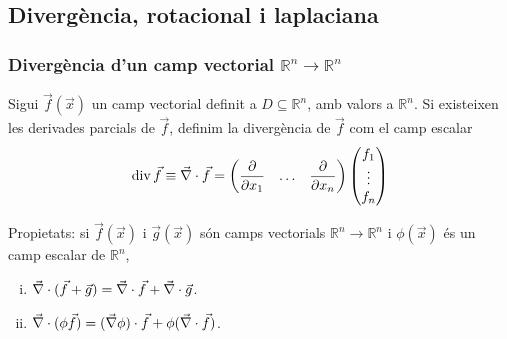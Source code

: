 \subsection{Divergència, rotacional i laplaciana}
\subsubsection*{Divergència d'un camp vectorial $\mathbb{R}^{n} \to \mathbb{R}^{n}$}
\begin{defi}[Divergència]
    Sigui $\vec{f}(\vec{x})$ un camp vectorial definit a $D \subseteq \mathbb{R}^{n}$, amb valors a $\mathbb{R}^{n}$. Si existeixen les derivades parcials de $\vec{f}$, definim la divergència de $\vec{f}$ com el camp escalar
    \begin{align}
        \operatorname{div} \vec{f} \equiv \vec{\nabla} \cdot \vec{f} = \begin{pmatrix} \displaystyle \frac{\partial}{\partial x_{1}} & \dots & \displaystyle \frac{\partial}{\partial x_{n}} \end{pmatrix} \begin{pmatrix} f_{1} \\ \vdots \\ f_{n} \end{pmatrix}
    \end{align}
\end{defi}
Propietats: si $\vec{f}(\vec{x})$ i $\vec{g}(\vec{x})$ són camps vectorials $\mathbb{R}^{n} \to \mathbb{R}^{n}$ i $\phi (\vec{x})$ és un camp escalar de $\mathbb{R}^{n}$,
\begin{enumerate}[i)]
    \item $\vec{\nabla} \cdot (\vec{f} + \vec{g}) = \vec{\nabla} \cdot \vec{f} + \vec{\nabla} \cdot \vec{g}$.
    \item $\vec{\nabla} \cdot (\phi \vec{f}) = (\vec{\nabla} \phi) \cdot \vec{f} + \phi (\vec{\nabla} \cdot \vec{f})$.
\end{enumerate}

